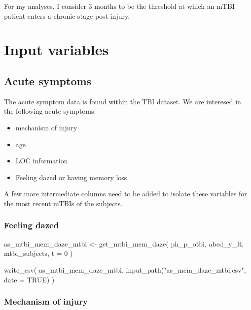 \documentclass[
  letterpaper,
  DIV=11,
  numbers=noendperiod]{scrreprt}
\newenvironment{Shaded}{\begin{snugshade}}{\end{snugshade}}
\newcommand{\AttributeTok}[1]{\textcolor[rgb]{0.40,0.45,0.13}{#1}}
\newcommand{\ConstantTok}[1]{\textcolor[rgb]{0.56,0.35,0.01}{#1}}
\newcommand{\DecValTok}[1]{\textcolor[rgb]{0.68,0.00,0.00}{#1}}
\newcommand{\FunctionTok}[1]{\textcolor[rgb]{0.28,0.35,0.67}{#1}}
\newcommand{\NormalTok}[1]{\textcolor[rgb]{0.00,0.23,0.31}{#1}}
\newcommand{\OtherTok}[1]{\textcolor[rgb]{0.00,0.23,0.31}{#1}}
\newcommand{\StringTok}[1]{\textcolor[rgb]{0.13,0.47,0.30}{#1}}
\providecommand{\tightlist}{%
  \setlength{\itemsep}{0pt}\setlength{\parskip}{0pt}}\usepackage{longtable,booktabs,array}
\begin{document}
For my analyses, I consider 3 months to be the threshold at which an
mTBI patient enters a chronic stage post-injury.

\section{Input variables}\label{input-variables}

\subsection{Acute symptoms}\label{acute-symptoms}

The acute symptom data is found within the TBI dataset. We are interesed
in the following acute symptoms:

\begin{itemize}
\tightlist
\item
  mechanism of injury
\item
  age
\item
  LOC information
\item
  Feeling dazed or having memory loss
\end{itemize}

A few more intermediate columns need to be added to isolate these
variables for the most recent mTBIs of the subjects.

\subsubsection{Feeling dazed}\label{feeling-dazed}

\begin{Shaded}
\begin{Highlighting}[]
\NormalTok{as\_mtbi\_mem\_daze\_mtbi }\OtherTok{\textless{}{-}} \FunctionTok{get\_mtbi\_mem\_daze}\NormalTok{(}
\NormalTok{    ph\_p\_otbi,}
\NormalTok{    abcd\_y\_lt,}
\NormalTok{    mtbi\_subjects,}
    \AttributeTok{t =} \DecValTok{0}
\NormalTok{)}

\FunctionTok{write\_csv}\NormalTok{(}
\NormalTok{    as\_mtbi\_mem\_daze\_mtbi,}
    \FunctionTok{input\_path}\NormalTok{(}\StringTok{"as\_mem\_daze\_mtbi.csv"}\NormalTok{, }\AttributeTok{date =} \ConstantTok{TRUE}\NormalTok{)}
\NormalTok{)}
\end{Highlighting}
\end{Shaded}

\subsubsection{Mechanism of injury}\label{mechanism-of-injury}
\end{document}
